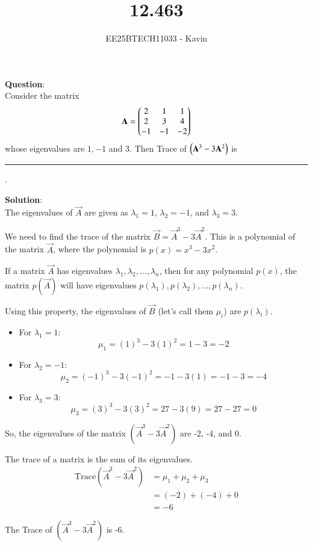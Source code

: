 \documentclass[journal]{IEEEtran}
\begin{document}

\vspace{3cm}

\title{12.463}
\author{EE25BTECH11033 - Kavin}
{\let\newpage\relax\maketitle}

\renewcommand{\thefigure}{\theenumi}
\renewcommand{\thetable}{\theenumi}
\setlength{\intextsep}{10pt} %
\textbf{Question}:\\
Consider the matrix
\begin{align*}
\mathbf{A} = \begin{pmatrix}2 & 1 & 1 \\ 2 & 3 & 4 \\ -1 & -1 & -2\end{pmatrix}
\end{align*}
whose eigenvalues are $1, -1$ and $3$. Then Trace of $\left(\mathbf{A}^3 - 3\mathbf{A}^2\right)$ is \rule{1cm}{0.01pt}.
\\    
\bigskip

\textbf{Solution}:\\
The eigenvalues of $\vec{A}$ are given as $\lambda_1 = 1$, $\lambda_2 = -1$, and $\lambda_3 = 3$.\\
\bigskip

We need to find the trace of the matrix $\vec{B} = \vec{A}^3 - 3\vec{A}^2$. This is a polynomial of the matrix $\vec{A}$, where the polynomial is $p(x) = x^3 - 3x^2$.\\
\bigskip

If a matrix $\vec{A}$ has eigenvalues $\lambda_1, \lambda_2, \dots, \lambda_n$, then for any polynomial $p(x)$, the matrix $p(\vec{A})$ will have eigenvalues $p(\lambda_1), p(\lambda_2), \dots, p(\lambda_n)$.\\
\bigskip

Using this property, the eigenvalues of $\vec{B}$ (let's call them $\mu_i$) are $p(\lambda_i)$.

\begin{itemize}
    \item For $\lambda_1 = 1$:
    $$ \mu_1 = (1)^3 - 3(1)^2 = 1 - 3 = -2 $$
    
    \item For $\lambda_2 = -1$:
    $$ \mu_2 = (-1)^3 - 3(-1)^2 = -1 - 3(1) = -1 - 3 = -4 $$
    
    \item For $\lambda_3 = 3$:
    $$ \mu_3 = (3)^3 - 3(3)^2 = 27 - 3(9) = 27 - 27 = 0 $$
\end{itemize}
So, the eigenvalues of the matrix $(\vec{A}^3 - 3\vec{A}^2)$ are -2, -4, and 0.\\
\bigskip


The trace of a matrix is the sum of its eigenvalues.
\begin{align*}
\text{Trace}(\vec{A}^3 - 3\vec{A}^2) &= \mu_1 + \mu_2 + \mu_3 \\
&= (-2) + (-4) + 0 \\
&= -6
\end{align*}

The Trace of $(\vec{A}^3 - 3\vec{A}^2)$ is -6.
\end{document}
